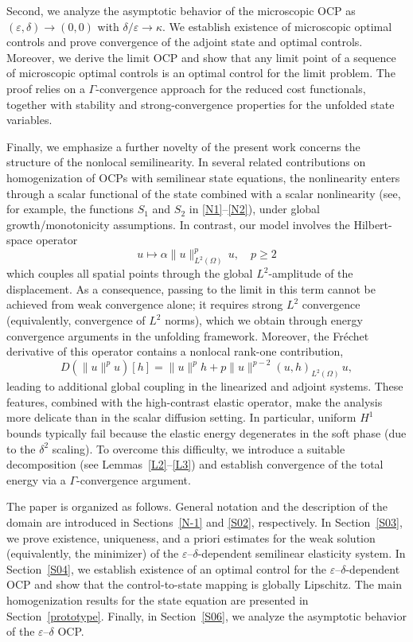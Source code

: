 \documentclass[11pt,a4paper]{article}
\numberwithin{equation}{section}
\def\d{\delta}
\def\e{\varepsilon}
\begin{document}
Second, we analyze the asymptotic behavior of the microscopic OCP as $(\e,\d)\to(0,0)$ with $\d/\e\to\kappa$. We establish existence of microscopic optimal controls and prove convergence of the adjoint state and optimal controls. Moreover, we derive the limit OCP and show that any limit point of a sequence of microscopic optimal controls is an optimal control for the limit problem. The proof relies on a $\Gamma$-convergence approach for the reduced cost functionals, together with stability and strong-convergence properties for the unfolded state variables.

Finally, we emphasize a further novelty of the present work concerns the structure of the nonlocal semilinearity.
In several related contributions on homogenization of OCPs with semilinear state equations, the nonlinearity
enters through a scalar functional of the state combined with a scalar nonlinearity (see, for example,
the functions $S_1$ and $S_2$ in \eqref{N1}--\eqref{N2}), under global growth/monotonicity assumptions. In contrast,
our model involves the Hilbert-space operator
\[
u \mapsto \alpha\|u\|_{L^2(\Omega)}^{p}\,u,\quad p\geq 2
\]
which couples all spatial points through the global $L^2$-amplitude of the displacement.
As a consequence, passing to the limit in this term cannot be achieved from weak convergence alone; it requires
strong $L^2$ convergence (equivalently, convergence of $L^2$ norms), which we obtain through energy convergence
arguments in the unfolding framework. Moreover, the Fr\'echet derivative of this operator contains a
nonlocal rank-one contribution,
\[
D(\|u\|^p u)[h]=\|u\|^p h + p\|u\|^{p-2}(u,h)_{L^2(\Omega)}\,u,
\]
leading to additional global coupling in the linearized and adjoint systems.
These features, combined with the high-contrast elastic operator, make the analysis more delicate than in the
scalar diffusion setting. In particular, uniform $H^1$ bounds typically fail because the elastic energy degenerates
in the soft phase (due to the $\delta^2$ scaling). To overcome this difficulty, we introduce a suitable decomposition
(see Lemmas~\ref{L2}--\ref{L3}) and establish convergence of the total energy via a $\Gamma$-convergence argument.

The paper is organized as follows. General notation and the description of the domain are introduced in
Sections~\ref{N-1} and \ref{S02}, respectively. In Section~\ref{S03}, we prove existence, uniqueness, and
a priori estimates for the weak solution (equivalently, the minimizer) of the $\varepsilon$--$\delta$-dependent
semilinear elasticity system. In Section~\ref{S04}, we establish existence of an optimal control for the
$\varepsilon$--$\delta$-dependent OCP and show that the control-to-state mapping is globally Lipschitz. The main homogenization results for the state equation are presented in
Section~\ref{prototype}.  Finally, in
Section~\ref{S06}, we analyze the asymptotic behavior of the $\varepsilon$--$\delta$ OCP.
\end{document}

